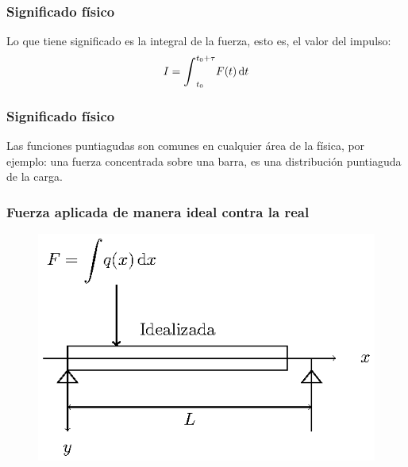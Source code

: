 \documentclass[12pt]{beamer}
\begin{document}
\begin{frame}
\frametitle{Significado físico}
Lo que tiene significado es la integral de la fuerza, esto es, el valor del impulso:
\pause
\begin{align*}
I = \scaleint{6ex}_{t_{0}}^{t_{0} + \tau } F (t) \dd{t}
\end{align*}
\end{frame}
\begin{frame}
\frametitle{Significado físico}
Las funciones puntiagudas son comunes en cualquier área de la física, \pause por ejemplo: una fuerza concentrada sobre una barra, es una distribución puntiaguda de la carga. %
\end{frame}
\begin{frame}
\frametitle{Fuerza aplicada de manera ideal contra la real}
\begin{figure}[H]
    \centering
    \includegraphics[scale=1.3]{Imagenes/delta_Dirac_02a.eps}
\end{figure}
\end{frame}
\end{document}
